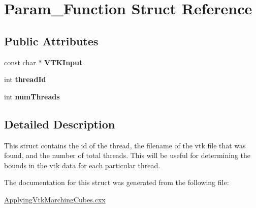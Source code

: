 \hypertarget{structParam__Function}{\section{\-Param\-\_\-\-Function \-Struct \-Reference}
\label{structParam__Function}
}
\subsection*{\-Public \-Attributes}
\begin{DoxyCompactItemize}
\item 
\hypertarget{structParam__Function_a4c6f53c4c47811f4718d953ac1992baa}{const char $\ast$ {\bfseries \-V\-T\-K\-Input}}\label{structParam__Function_a4c6f53c4c47811f4718d953ac1992baa}

\item 
\hypertarget{structParam__Function_a22891fef7632bbca3be29572c6f4f44b}{int {\bfseries thread\-Id}}\label{structParam__Function_a22891fef7632bbca3be29572c6f4f44b}

\item 
\hypertarget{structParam__Function_adf10a3e99d8c479168f44822e31b9c7a}{int {\bfseries num\-Threads}}\label{structParam__Function_adf10a3e99d8c479168f44822e31b9c7a}

\end{DoxyCompactItemize}


\subsection{\-Detailed \-Description}
\-This struct contains the id of the thread, the filename of the vtk file that was found, and the number of total threads. \-This will be useful for determining the bounds in the vtk data for each particular thread. 

\-The documentation for this struct was generated from the following file\-:\begin{DoxyCompactItemize}
\item 
\hyperlink{ApplyingVtkMarchingCubes_8cxx}{\-Applying\-Vtk\-Marching\-Cubes.\-cxx}\end{DoxyCompactItemize}
